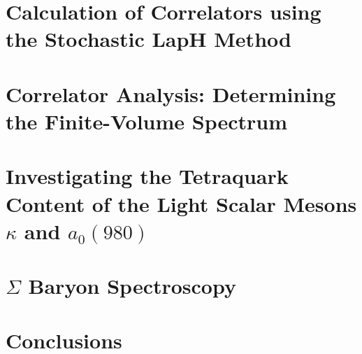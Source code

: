 \documentclass[12pt]{report}
\begin{document}
\chapter{Calculation of Correlators using the Stochastic LapH Method}\label{ch:montecarlo}


\chapter{Correlator Analysis: Determining the Finite-Volume Spectrum}\label{ch:analysis}


% 

\chapter{Investigating the Tetraquark Content of the Light Scalar Mesons $\kappa$ and $a_0(980)$}\label{ch:tetraquarks}


\chapter{$\Sigma$ Baryon Spectroscopy}\label{ch:sigmas}


\chapter{Conclusions}\label{ch:conclusions}




\end{document}
